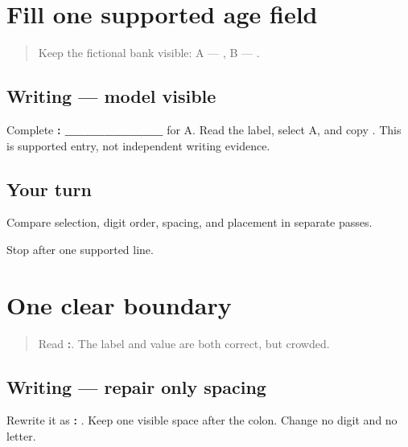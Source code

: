 \section[\texorpdfstring{\pa{ਉਮਰ}: \_\_\_\_\_\_\_\_\_\_ (age field)}{ਉਮਰ: \_\_\_\_\_\_\_\_\_\_ (age field)}]{Fill one supported age field}

\label{lesson:PA-W07-age-supported}



\begin{quote}
Keep the fictional bank visible: A — \textbf{}, B — \textbf{}.
\end{quote}

\subsection*{Writing — model visible}
Complete \textbf{: \_\_\_\_\_\_\_\_\_\_} for A. Read the label, select A, and copy \textbf{}. This is supported entry, not independent writing evidence.

\subsection*{Your turn}
Compare selection, digit order, spacing, and placement in separate passes.

\begin{tcolorbox}[breakable,colback=teal!4,colframe=teal!35!black,title={Before you move on}]
Stop after one supported line.
\end{tcolorbox}
\section[\texorpdfstring{\pa{ਉਮਰ}: \pa{੧੫} (age label and value boundary)}{ਉਮਰ: ੧੫ (age label and value boundary)}]{One clear boundary}

\label{lesson:PA-W07-age-spacing}



\begin{quote}
Read \textbf{:}. The label and value are both correct, but crowded.
\end{quote}

\subsection*{Writing — repair only spacing}
Rewrite it as \textbf{: }. Keep one visible space after the colon. Change no digit and no letter.


